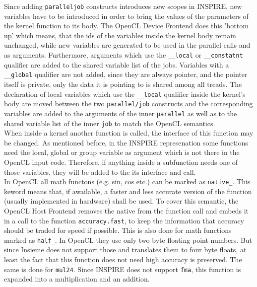 Since adding \texttt{parallel\/job} constructs introduces new scopes in INSPIRE, new variables have to be introduced in order to bring the values of the parameters of the kernel function to its body. The OpenCL Device Frontend does this 'bottom up' which means, that the ids of the variables inside the kernel body remain unchanged, while new variables are generated to be used in the parallel calls and as arguments. Furthermore, arguments which use the \texttt{\_\_local} or \texttt{\_\_constatnt} qualifier are added to the shared variable list of the jobs. Variables with a \texttt{\_\_global} qualifier are not added, since they are always pointer, and the pointer itself is private, only the data it is pointing to is shared among all treads. The declaration of local variables which use the \texttt{\_\_local} qualifier inside the kernel's body are moved between the two \texttt{parallel/job} constructs and the corresponding variables are added to the arguments of the inner \texttt{parallel} as well as to the shared variable list of the inner \texttt{job} to match the OpenCL semantics. \\

When inside a kernel another function is called, the interface of this function may be changed. As mentioned before, in the INSPIRE represenation some functions need the local, global or group variable as argument which is not there in the OpenCL input code. Therefore, if anything inside a subfunction needs one of those variables, they will be added to the its interface and call. \\

In OpenCL all math functons (e.g. sin, cos etc.) can be marked as \texttt{native\_}. This keword means that, if awailable, a faster and less accurate version of the function (usually implemented in hardware) shall be used. To cover this semantic, the OpenCL Host Frontend removes the native from the function call and embeds it in a call to the function \texttt{accuracy.fast}, to keep the information that accuracy should be traded for speed if possible. This is also done for math functions marked as \texttt{half\_}. In OpenCL they use only two byte floating point numbers. But since Insieme does not support those and translates them to four byte floats, at least the fact that this function does not need high accuracy is preserved. The same is done for \texttt{mul24}. Since INSPIRE does not support \texttt{fma}, this function is expanded into a multiplication and an addition. \\

